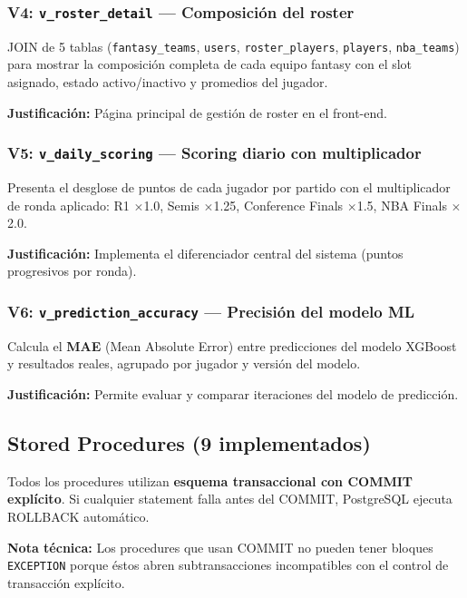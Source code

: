 \documentclass[12pt,a4paper]{article}
\begin{document}
\subsubsection{V4: \texttt{v\_roster\_detail} --- Composici\'on del roster}

JOIN de 5 tablas (\texttt{fantasy\_teams}, \texttt{users}, \texttt{roster\_players}, \texttt{players}, \texttt{nba\_teams})
para mostrar la composici\'on completa de cada equipo fantasy con el slot asignado, estado activo/inactivo
y promedios del jugador.

\textbf{Justificaci\'on:} P\'agina principal de gesti\'on de roster en el front-end.

\subsubsection{V5: \texttt{v\_daily\_scoring} --- Scoring diario con multiplicador}

Presenta el desglose de puntos de cada jugador por partido con el multiplicador de ronda
aplicado: R1 $\times$1.0, Semis $\times$1.25, Conference Finals $\times$1.5, NBA Finals $\times$2.0.

\textbf{Justificaci\'on:} Implementa el diferenciador central del sistema (puntos progresivos por ronda).

\subsubsection{V6: \texttt{v\_prediction\_accuracy} --- Precisi\'on del modelo ML}

Calcula el \textbf{MAE} (Mean Absolute Error) entre predicciones del modelo XGBoost y resultados reales,
agrupado por jugador y versi\'on del modelo.

\textbf{Justificaci\'on:} Permite evaluar y comparar iteraciones del modelo de predicci\'on.

\subsection{Stored Procedures (9 implementados)}

Todos los procedures utilizan \textbf{esquema transaccional con COMMIT expl\'icito}.
Si cualquier statement falla antes del COMMIT, PostgreSQL ejecuta ROLLBACK autom\'atico.

\textbf{Nota t\'ecnica:} Los procedures que usan COMMIT no pueden tener bloques \texttt{EXCEPTION}
porque \'estos abren subtransacciones incompatibles con el control de transacci\'on expl\'icito.
\end{document}

